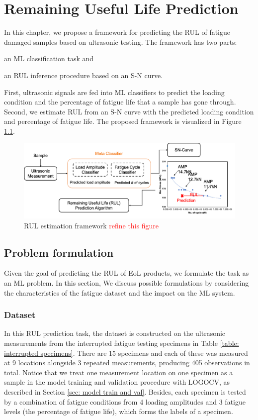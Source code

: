 \chapter{Remaining Useful Life Prediction}
\label{chap: rul}

In this chapter, we propose a framework for predicting the RUL of fatigue damaged samples based on ultrasonic testing. The framework has two parts: \begin{enumerate*}[label=(\alph*)]
    \item an ML classification task and
    \item an RUL inference procedure based on an S-N curve.
\end{enumerate*}  First, ultrasonic signals are fed into ML classifiers to predict the loading condition and the percentage of fatigue life that a sample has gone through. Second, we estimate RUL from an S-N curve with the predicted loading condition and percentage of fatigue life. The proposed framework is visualized in Figure \ref{fig: rul framework}.

\begin{figure}
    \centering
    \includegraphics[width=\linewidth]{fig/rul_framework.png}
    \caption{RUL estimation framework \textcolor{red}{refine this figure}}
    \label{fig: rul framework}
\end{figure}

\section{Problem formulation}
\label{sec: rul prob formulation}
Given the goal of predicting the RUL of EoL products, we formulate the task as an ML problem. In this section, We discuss possible formulations by considering the characteristics of the fatigue dataset and the impact on the ML system.

\subsection{Dataset}
In this RUL prediction task, the dataset is constructed on the ultrasonic measurements from the interrupted fatigue testing specimens in Table \ref{table: interrupted specimens}. There are 15 specimens and each of these was measured at 9 locations alongside 3 repeated measurements, producing 405 observations in total. Notice that we treat one measurement location on one specimen as a sample in the model training and validation procedure with LOGOCV, as described in Section \ref{sec: model train and val}. Besides, each specimen is tested by a combination of fatigue conditions from 4 loading amplitudes and 3 fatigue levels (the percentage of fatigue life), which forms the labels of a specimen.


